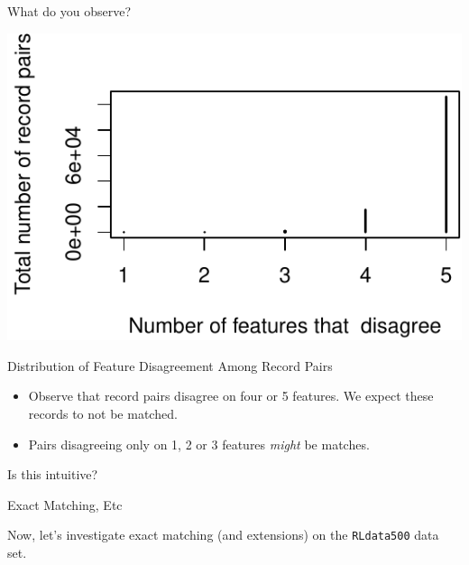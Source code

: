 \documentclass[
  ignorenonframetext,
]{beamer}
\providecommand{\tightlist}{%
  \setlength{\itemsep}{0pt}\setlength{\parskip}{0pt}}
\begin{document}
\begin{frame}{What do you observe?}
\protect\hypertarget{what-do-you-observe}{}

\footnotesize

\begin{center}\includegraphics{pipeline-approaches_files/figure-beamer/unnamed-chunk-6-1} \end{center}

\end{frame}

\begin{frame}{Distribution of Feature Disagreement Among Record Pairs}
\protect\hypertarget{distribution-of-feature-disagreement-among-record-pairs-1}{}

\begin{itemize}
\tightlist
\item
  Observe that record pairs disagree on four or 5 features. We expect
  these records to not be matched.
\end{itemize}

\pause

\begin{itemize}
\tightlist
\item
  Pairs disagreeing only on 1, 2 or 3 features \emph{might} be matches.
\end{itemize}

\pause

\vspace*{2em}

Is this intuitive?

\end{frame}

\begin{frame}{Exact Matching, Etc}
\protect\hypertarget{exact-matching-etc}{}

Now, let's investigate exact matching (and extensions) on the
\texttt{RLdata500} data set.

\end{frame}
\end{document}
